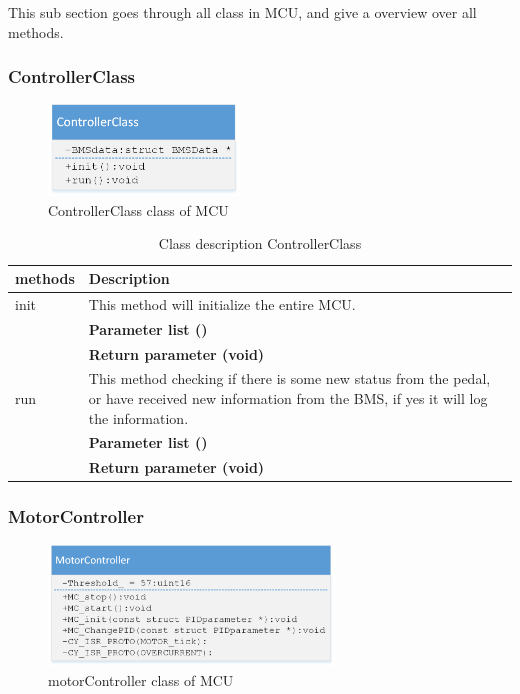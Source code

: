 This sub section goes through all class in MCU, and give a overview over all methods.

\subsubsection{ControllerClass}

\begin{figure}[H]
	\centering
	\includegraphics [width=2in]{Software/Pictures/class-diagram-controllerClass.png}
	\caption{ControllerClass class of MCU}
	\label{fig:Class_diagram_MCU_ControllerClass}
\end{figure}

\begin{table}[H]
	\centering
	\begin{tabular}{|p{5 cm}|p{10 cm}|}
		\hline
		\textbf{methods} & \textbf{Description} \\ \hline
		
		init
		& This method will initialize the entire MCU.
		\\ & \textbf{Parameter list ()}
		\\ & \textbf{Return parameter (void)}
		\\ \hline
		
		run
		& This method checking if there is some new status from the pedal, or have received new information from the BMS, if yes it will log the information. 
		\\ & \textbf{Parameter list ()}
		\\ & \textbf{Return parameter (void)}
		\\ \hline
		
	\end{tabular}
	\caption{Class description ControllerClass}
	\label{table:Class_description_ControllerClass_MCU}
\end{table}

\subsubsection{MotorController}

\begin{figure}[H]
	\centering
	\includegraphics [width=3in]{Software/Pictures/class-diagram-motorControllerClass.png}
	\caption{motorController class of MCU}
	\label{fig:Class_diagram_MCU_motorControllerClass}
\end{figure}

